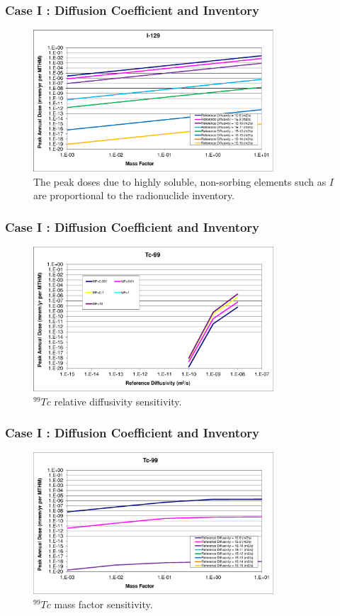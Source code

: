 \begin{frame}[c]
  \frametitle{Case I : Diffusion Coefficient and Inventory}
\begin{figure}[ht]
\centering
\includegraphics[width=0.8\textwidth]{DiffCoeffAndInvEBSFail/I-129-MF.eps}
\caption{The peak doses due to highly soluble, non-sorbing elements such as $I$ 
are  proportional to the radionuclide inventory.}
\label{fig:DCInvI129MF}
\end{figure}
\end{frame}

\begin{frame}[c]
  \frametitle{Case I : Diffusion Coefficient and Inventory}
\begin{figure}[ht!]
\centering
\includegraphics[width=0.8\textwidth]{DiffCoeffAndInvEBSFail/Tc-99.eps}
\caption{$^{99}Tc$ relative diffusivity sensitivity.} 
\label{fig:DCInvTc99}
\end{figure}
\end{frame}

\begin{frame}[c]
  \frametitle{Case I : Diffusion Coefficient and Inventory}

\begin{figure}[ht!]
\centering
\includegraphics[width=0.8\textwidth]{DiffCoeffAndInvEBSFail/Tc-99-MF.eps}
\caption{$^{99}Tc$ mass factor sensitivity.}
\label{fig:DCInvTc99MF}
\end{figure}
\end{frame}

